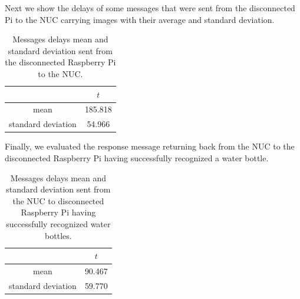 Next we show the delays of some messages that were sent from the disconnected Pi to the NUC carrying images with their average and standard deviation.
\begin{table}[H]
	\centering
\begin{tabular}{c|c}\toprule
		  & $t$  \\ \midrule
mean&	185.818\\
standard deviation&	54.966\\
\end{tabular}
	\caption{Messages delays mean and standard deviation sent from the disconnected Raspberry Pi to the NUC.}
	\label{table:DIS2}
\end{table}

\noindent Finally, we evaluated the response message returning back from the NUC to the disconnected Raspberry Pi having successfully recognized a water bottle.

\begin{table}[H]
	\centering
	\begin{tabular}{c|c}\toprule
		& $t$  \\ \midrule
mean& 	90.467\\
standard deviation&	59.770\\
	\end{tabular}
	\caption{Messages delays mean and standard deviation sent from the NUC to disconnected Raspberry Pi having successfully recognized water bottles.}
	\label{table:DIS3}
\end{table}


